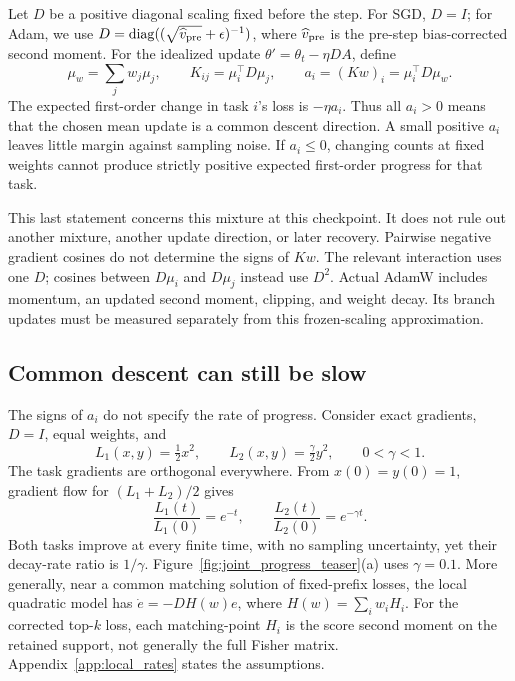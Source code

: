 Let $D$ be a positive diagonal scaling fixed before the step. For SGD,
$D=I$; for Adam, we use
$D=\operatorname{diag}((\sqrt{\widehat v_{\rm pre}}+\epsilon)^{-1})$,
where $\widehat v_{\rm pre}$ is the pre-step bias-corrected second moment.
For the idealized update $\theta'=\theta_t-\eta DA$, define
\begin{equation}
    \mu_w=\sum_jw_j\mu_j,\qquad
    K_{ij}=\mu_i^\top D\mu_j,\qquad
    a_i=(Kw)_i=\mu_i^\top D\mu_w.
    \label{eq:transfer_margins}
\end{equation}
The expected first-order change in task $i$'s loss is $-\eta a_i$.
Thus all $a_i>0$ means that the chosen mean update is a common descent
direction. A small positive $a_i$ leaves little margin against sampling
noise. If $a_i\leq0$, changing counts at fixed weights cannot produce
strictly positive expected first-order progress for that task.

This last statement concerns this mixture at this checkpoint. It does
not rule out another mixture, another update direction, or later recovery.
Pairwise negative gradient cosines do not determine the signs of $Kw$.
The relevant interaction uses one $D$; cosines between $D\mu_i$ and
$D\mu_j$ instead use $D^2$. Actual AdamW includes momentum, an updated
second moment, clipping, and weight decay. Its branch updates must be
measured separately from this frozen-scaling approximation.

\subsection{Common descent can still be slow}
\label{sec:local_rates}

The signs of $a_i$ do not specify the rate of progress. Consider exact
gradients, $D=I$, equal weights, and
\begin{equation}
    L_1(x,y)=\tfrac12x^2,\qquad
    L_2(x,y)=\tfrac{\gamma}{2}y^2,\qquad 0<\gamma<1.
    \label{eq:zero_conflict_losses}
\end{equation}
The task gradients are orthogonal everywhere. From $x(0)=y(0)=1$,
gradient flow for $(L_1+L_2)/2$ gives
\begin{equation}
    \frac{L_1(t)}{L_1(0)}=e^{-t},\qquad
    \frac{L_2(t)}{L_2(0)}=e^{-\gamma t}.
    \label{eq:zero_conflict_rates}
\end{equation}
Both tasks improve at every finite time, with no sampling uncertainty,
yet their decay-rate ratio is $1/\gamma$.
Figure~\ref{fig:joint_progress_teaser}(a) uses $\gamma=0.1$.
More generally, near a common matching solution of fixed-prefix losses,
the local quadratic model has
$\dot e=-D H(w)e$, where $H(w)=\sum_iw_iH_i$.
For the corrected top-$k$ loss, each matching-point $H_i$ is the
score second moment on the retained support, not generally the full
Fisher matrix. Appendix~\ref{app:local_rates} states the assumptions.

